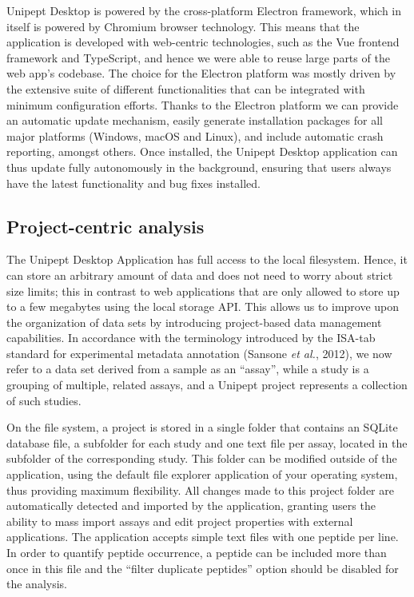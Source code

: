 Unipept Desktop is powered by the cross-platform Electron framework,
which in itself is powered by Chromium browser technology. This means
that the application is developed with web-centric technologies, such as
the Vue frontend framework and TypeScript, and hence we were able to
reuse large parts of the web app's codebase. The choice for the Electron
platform was mostly driven by the extensive suite of different
functionalities that can be integrated with minimum configuration
efforts. Thanks to the Electron platform we can provide an automatic
update mechanism, easily generate installation packages for all major
platforms (Windows, macOS and Linux), and include automatic crash
reporting, amongst others. Once installed, the Unipept Desktop
application can thus update fully autonomously in the background,
ensuring that users always have the latest functionality and bug fixes
installed.

\hypertarget{project-centric-analysis}{%
\subsection{Project-centric analysis}\label{project-centric-analysis}}

The Unipept Desktop Application has full access to the local filesystem.
Hence, it can store an arbitrary amount of data and does not need to
worry about strict size limits; this in contrast to web applications
that are only allowed to store up to a few megabytes using the local
storage API. This allows us to improve upon the organization of data
sets by introducing project-based data management capabilities. In
accordance with the terminology introduced by the ISA-tab standard for
experimental metadata annotation (Sansone \emph{et al.}, 2012), we now
refer to a data set derived from a sample as an ``assay'', while a study
is a grouping of multiple, related assays, and a Unipept project
represents a collection of such studies.

On the file system, a project is stored in a single folder that contains
an SQLite database file, a subfolder for each study and one text file
per assay, located in the subfolder of the corresponding study. This
folder can be modified outside of the application, using the default
file explorer application of your operating system, thus providing
maximum flexibility. All changes made to this project folder are
automatically detected and imported by the application, granting users
the ability to mass import assays and edit project properties with
external applications. The application accepts simple text files with
one peptide per line. In order to quantify peptide occurrence, a peptide
can be included more than once in this file and the ``filter duplicate
peptides'' option should be disabled for the analysis.

